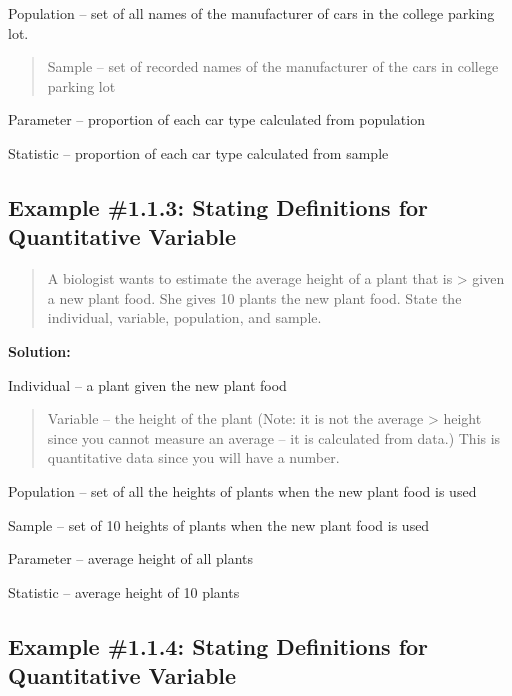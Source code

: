 \documentclass[]{book}
\begin{document}
Population -- set of all names of the manufacturer of cars in the college parking lot.

\begin{quote}
Sample -- set of recorded names of the manufacturer of the cars in college parking lot
\end{quote}

Parameter -- proportion of each car type calculated from population

Statistic -- proportion of each car type calculated from sample

\hypertarget{example-1.1.3-stating-definitions-for-quantitative-variable}{%
\subsection{Example \#1.1.3: Stating Definitions for Quantitative Variable}\label{example-1.1.3-stating-definitions-for-quantitative-variable}}

\begin{quote}
A biologist wants to estimate the average height of a plant that is \textgreater{} given a new plant food. She gives 10 plants the new plant food. State the individual, variable, population, and sample.
\end{quote}

\textbf{Solution:}

Individual -- a plant given the new plant food

\begin{quote}
Variable -- the height of the plant (Note: it is not the average \textgreater{} height since you cannot measure an average -- it is calculated from data.) This is quantitative data since you will have a number.
\end{quote}

Population -- set of all the heights of plants when the new plant food is used

Sample -- set of 10 heights of plants when the new plant food is used

Parameter -- average height of all plants

Statistic -- average height of 10 plants

\hypertarget{example-1.1.4-stating-definitions-for-quantitative-variable}{%
\subsection{Example \#1.1.4: Stating Definitions for Quantitative Variable}\label{example-1.1.4-stating-definitions-for-quantitative-variable}}
\end{document}
